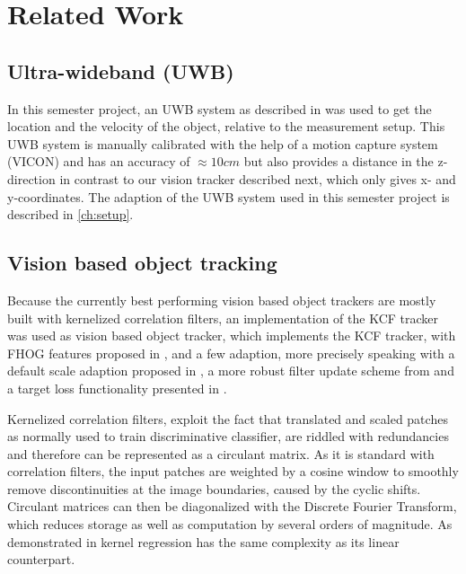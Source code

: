 
\setcounter{chapter}{1}

\chapter{Related Work}

\section{Ultra-wideband (UWB)}
In this semester project, an \ac{UWB} system as described in \cite{Naegeli:2016} was used to get the location and the velocity of the object, relative to the measurement setup. This \ac{UWB} system is manually calibrated with the help of a motion capture system (VICON) and has an accuracy of $\approx 10 cm$ but also provides a distance in the z-direction in contrast to our vision tracker described next, which only gives x- and y-coordinates. The adaption of the \ac{UWB} system used in this semester project is described in \autoref{ch:setup}.

\section{Vision based object tracking}
Because the currently best performing vision based object trackers are mostly built with kernelized correlation filters, an implementation of the \ac{KCF} tracker \cite{henriques2015tracking} was used as vision based object tracker\cite{Haag:2015}, which implements the \ac{KCF} tracker, with FHOG features proposed in \cite{lsvm-pami}, and a few adaption, more precisely speaking with a default scale adaption proposed in \cite{danelljan2014dsst}, a more robust filter update scheme from \cite{danelljan2014colorattributes} and a target loss functionality presented in \cite{bolme2010mosse}.

Kernelized correlation filters, exploit the fact that translated and scaled patches as normally used to train discriminative classifier, are riddled with redundancies and therefore can be represented as a circulant matrix. As it is standard with correlation filters, the input patches are weighted by a cosine window to smoothly remove discontinuities at the image boundaries, caused by the cyclic shifts. Circulant matrices can then be diagonalized with the Discrete Fourier Transform, which reduces storage as well as computation by several orders of magnitude. As demonstrated in \cite{henriques2015tracking} kernel regression has the same complexity as its linear counterpart.

